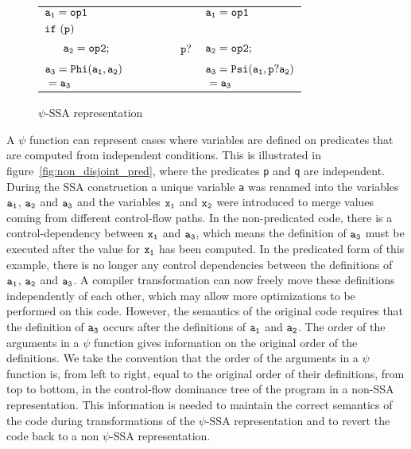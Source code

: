\begin{figure}
\begin{center}
\footnotesize
\begin{tabular}{llll}
${\tt a_1 = op1}$ & & & ${\tt a_1 = op1}$ \\
${\tt if\ (p)}$        & & & \\
${\tt\ \ \ \ \ a_2 = op2;}$ & \ \ \ \ \  & ${\tt p?}$ & ${\tt a_2 = op2;}$ \\
${\tt a_3 = Phi(a_1, a_2)}$ & & & ${\tt a_3 = Psi(a_1, p?a_2)}$ \\
${\tt \ = a_3}$ & & & ${\tt \ = a_3}$ \\
\end{tabular}
\caption{$\psi$-SSA representation}
\label{fig:op_pred}
\end{center}
\end{figure}

A $\psi$ function can represent cases where variables are defined on
predicates that are computed from independent conditions. This is
illustrated in figure~\ref{fig:non_disjoint_pred}, where the
predicates {\tt p} and {\tt q} are independent. During the SSA
construction a unique variable {\tt a} was renamed into the variables
${\tt a_1}$, ${\tt a_2}$ and ${\tt a_3}$ and the variables ${\tt x_1}$
and ${\tt x_2}$ were introduced to merge values coming from different
control-flow paths. In the non-predicated code, there is a
control-dependency between ${\tt x_1}$ and ${\tt a_3}$, which means
the definition of ${\tt a_3}$ must be executed after the value for
${\tt x_1}$ has been computed. In the predicated form of this example,
there is no longer any control dependencies between the definitions of
${\tt a_1}$, ${\tt a_2}$ and ${\tt a_3}$. A compiler transformation
can now freely move these definitions independently of each other,
which may allow more optimizations to be performed on this
code. However, the semantics of the original code requires that the
definition of ${\tt a_3}$ occurs after the definitions of ${\tt a_1}$
and ${\tt a_2}$. The order of the arguments in a $\psi$ function gives
information on the original order of the definitions. We take the
convention that the order of the arguments in a $\psi$ function is,
from left to right, equal to the original order of their definitions,
from top to bottom, in the control-flow dominance tree of the program
in a non-SSA representation. This information is needed to maintain
the correct semantics of the code during transformations of the
$\psi$-SSA representation and to revert the code back to a non
$\psi$-SSA representation.

